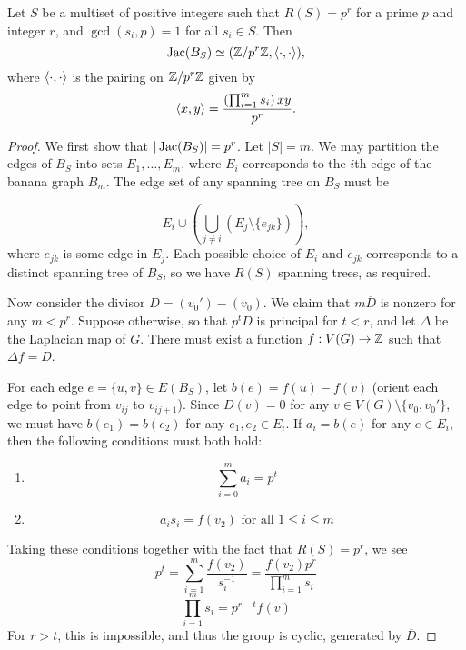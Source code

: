 \documentclass{amsart}
\begin{document}
\begin{prop}
  \label{prop:banana_pairing}
  Let $S$ be a multiset of positive integers such that $R(S) = p^r$
  for a prime $p$ and integer $r$, and $\gcd(s_i, p) = 1$ for all $s_i
  \in S$. Then
  \begin{equation*}
    \operatorname{Jac}(B_S) \simeq (\mathbb{Z}/p^r\mathbb{Z}, \langle \cdot, \cdot \rangle),
  \end{equation*}
  where $\langle \cdot, \cdot \rangle$ is the pairing on $\mathbb{Z}/p^r\mathbb{Z}$ given by
  \begin{equation*}
    \langle x, y \rangle = \frac{\left(\prod_{i=1}^ms_i\right)xy}{p^r}.
  \end{equation*}
\end{prop}
\begin{proof}
  We first show that $|\operatorname{Jac}(B_S)| = p^r$. Let $|S| = m$. We may
  partition the edges of $B_S$ into sets $E_1, \ldots, E_m$, where
  $E_i$ corresponds to the $i$th edge of the banana graph $B_m$. The
  edge set of any spanning tree on $B_S$ must be

  \begin{equation*}
    E_i \cup \left(\bigcup_{j \ne i} (E_j \setminus \{e_{jk}\})\right),
  \end{equation*}
  where $e_{jk}$ is some edge in $E_j$. Each possible choice of $E_i$
  and $e_{jk}$ corresponds to a distinct spanning tree of $B_S$, so we
  have $R(S)$ spanning trees, as required.

  Now consider the divisor $D = (v_0') - (v_0)$. We claim that
  $m\overline{D}$ is nonzero for any $m < p^r$. Suppose otherwise, so
  that $p^tD$ is principal for $t < r$, and let $\Delta$ be the
  Laplacian map of $G$. There must exist a function $f:V(G) \to \mathbb{Z}$
  such that $\Delta f = D$.

  For each edge $e = \{u, v\} \in E(B_S)$, let $b(e) = f(u) - f(v)$
  (orient each edge to point from $v_{ij}$ to $v_{ij+1}$). Since $D(v)
  = 0$ for any $v \in V(G) \setminus \{v_0, v_0'\}$, we must have
  $b(e_1) = b(e_2)$ for any $e_1, e_2 \in E_i$.  If $a_i = b(e)$ for
  any $e \in E_i$, then the following conditions must both hold:
  
  \begin{enumerate}
    \item 
      \[
      \sum_{i=0}^m a_i = p^t
      \]
    \item
      \[
      a_is_i = f(v_2) \textrm{ for all } 1 \le i \le m
      \]
  \end{enumerate}

  Taking these conditions together with the fact that $R(S) = p^r$, we
  see
  \begin{equation*}
    p^t = \sum_{i=1}^m \frac{f(v_2)}{s_i^{-1}} = 
    \frac{f(v_2) p^r}{\prod_{i=1}^ms_i}
  \end{equation*}
  \begin{equation*}
    \prod_{i=1}^ms_i = p^{r-t}f(v)
  \end{equation*}
  For $r > t$, this is impossible, and thus the group is cyclic,
  generated by $\overline{D}$. 


\end{proof}
\end{document}
